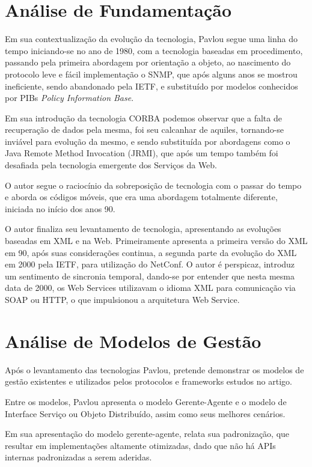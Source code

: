 \documentclass[12pt]{article}
\begin{document}
\section{Análise de Fundamentação}

Em sua contextualização da evolução da tecnologia, Pavlou segue uma linha do tempo iniciando-se no ano de 1980, com a tecnologia baseadas em procedimento, passando pela primeira abordagem por orientação a objeto, ao nascimento do protocolo leve e fácil implementação o SNMP, que após alguns anos se mostrou ineficiente, sendo abandonado pela IETF, e substituído por modelos conhecidos por PIBs \textit{Policy Information Base}.

Em sua introdução da tecnologia CORBA podemos observar que a falta de recuperação de dados pela mesma, foi seu calcanhar de aquiles, tornando-se inviável para evolução da mesmo, e sendo substituída por abordagens como o Java Remote Method Invocation (JRMI), que após um tempo também foi desafiada pela tecnologia emergente dos Serviços da Web.

O autor segue o raciocínio da sobreposição de tecnologia com o passar do tempo e aborda os códigos móveis, que era uma abordagem totalmente diferente, iniciada no início dos anos 90.

O autor finaliza seu levantamento de tecnologia, apresentando as evoluções baseadas em XML e na Web. Primeiramente apresenta a primeira versão do XML em 90, após suas considerações continua, a segunda parte da evolução do XML em 2000 pela IETF, para utilização do NetConf. O autor é perspicaz, introduz um sentimento de sincronia temporal, dando-se por entender que nesta mesma data de 2000, os Web Services utilizavam o idioma XML para comunicação via SOAP ou HTTP, o que impulsionou a arquitetura Web Service.      


\section{Análise de Modelos de Gestão}
	Após o levantamento das tecnologias Pavlou, pretende demonstrar os modelos de gestão existentes e utilizados pelos protocolos e frameworks estudos no artigo.
	
	Entre os modelos, Pavlou apresenta o modelo Gerente-Agente e o modelo de Interface Serviço ou Objeto Distribuído, assim como seus melhores cenários.
	
	Em sua apresentação do modelo gerente-agente, relata sua padronização, que resultar em implementações altamente otimizadas, dado que não há APIs internas padronizadas a serem aderidas.
	
\end{document}
